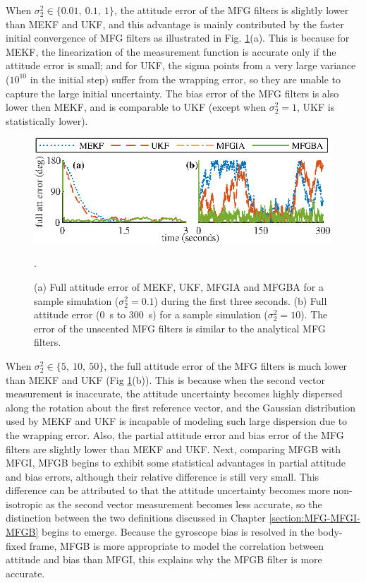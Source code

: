 When $\sigma_2^2 \in \{0.01,\ 0.1,\ 1\}$, the attitude error of the MFG filters is slightly lower than MEKF and UKF, and this advantage is mainly contributed by the faster initial convergence of MFG filters as illustrated in Fig. \ref{fig:attEst-sim2-trajectory-att}(a).
This is because for MEKF, the linearization of the measurement function is accurate only if the attitude error is small; and for UKF, the sigma points from a very large variance ($10^{10}$ in the initial step) suffer from the wrapping error, so they are unable to capture the large initial uncertainty.
The bias error of the MFG filters is also lower then MEKF, and is comparable to UKF (except when $\sigma_2^2=1$, UKF is statistically lower).

\begin{figure}
	\centering
	\includegraphics[scale=1.4]{figures/attEst-sim2-trajectory-att}
	\caption{(a) Full attitude error of MEKF, UKF, MFGIA and MFGBA for a sample simulation ($\sigma_2^2 = 0.1$) during the first three seconds.
		(b) Full attitude error (\SI{0}{\second} to \SI{300}{\second}) for a sample simulation ($\sigma_2^2 = 10$).
		The error of the unscented MFG filters is similar to the analytical MFG filters. \label{fig:attEst-sim2-trajectory-att}}.
\end{figure}

When $\sigma_2^2 \in \{5,\ 10,\ 50\}$, the full attitude error of the MFG filters is much lower than MEKF and UKF (Fig \ref{fig:attEst-sim2-trajectory-att}(b)).
This is because when the second vector measurement is inaccurate, the attitude uncertainty becomes highly dispersed along the rotation about the first reference vector, and the Gaussian distribution used by MEKF and UKF is incapable of modeling such large dispersion due to the wrapping error.
Also, the partial attitude error and bias error of the MFG filters are slightly lower than MEKF and UKF.
Next, comparing MFGB with MFGI, MFGB begins to exhibit some statistical advantages in partial attitude and bias errors, although their relative difference is still very small.
This difference can be attributed to that the attitude uncertainty becomes more non-isotropic as the second vector measurement becomes less accurate, so the distinction between the two definitions discussed in Chapter \ref{section:MFG-MFGI-MFGB} begins to emerge.
Because the gyroscope bias is resolved in the body-fixed frame, MFGB is more appropriate to model the correlation between attitude and bias than MFGI, this explains why the MFGB filter is more accurate.

